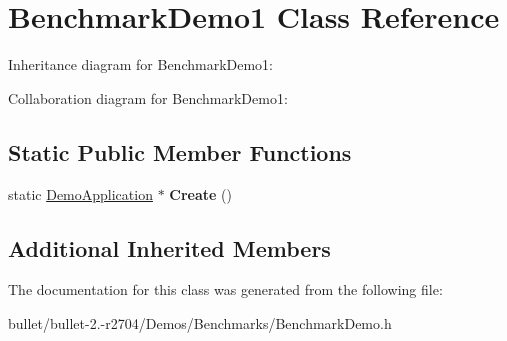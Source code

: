 \hypertarget{class_benchmark_demo1}{\section{Benchmark\+Demo1 Class Reference}
\label{class_benchmark_demo1}
}


Inheritance diagram for Benchmark\+Demo1\+:


Collaboration diagram for Benchmark\+Demo1\+:
\subsection*{Static Public Member Functions}
\begin{DoxyCompactItemize}
\item 
\hypertarget{class_benchmark_demo1_a07ce8cb2b8d7078c89cefbb3f438b275}{static \hyperlink{class_demo_application}{Demo\+Application} $\ast$ {\bfseries Create} ()}\label{class_benchmark_demo1_a07ce8cb2b8d7078c89cefbb3f438b275}

\end{DoxyCompactItemize}
\subsection*{Additional Inherited Members}


The documentation for this class was generated from the following file\+:\begin{DoxyCompactItemize}
\item 
bullet/bullet-\/2.-\/r2704/\+Demos/\+Benchmarks/Benchmark\+Demo.\+h\end{DoxyCompactItemize}
